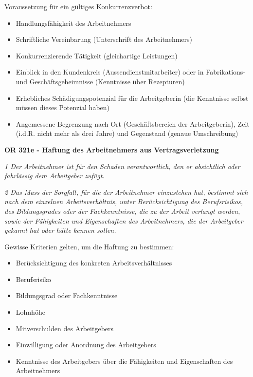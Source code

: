 \noindent
Voraussetzung für ein gültiges Konkurrenzverbot:
\begin{itemize}
  \item Handlungsfähigkeit des Arbeitnehmers
  \item Schriftliche Vereinbarung (Unterschrift des Arbeitnehmers)
  \item Konkurrenzierende Tätigkeit (gleichartige Leistungen)
  \item Einblick in den Kundenkreis (Aussendienstmitarbeiter) oder in Fabrikations- und Geschäftsgeheimnisse (Kenntnisse über Rezepturen)
  \item Erhebliches Schädigungspotenzial für die Arbeitgeberin (die Kenntnisse selbst müssen dieses Potenzial haben)
  \item Angemessene Begrenzung nach Ort (Geschäftsbereich der Arbeitgeberin), Zeit (i.d.R. nicht mehr als drei Jahre) und Gegenstand (genaue Umschreibung)
\end{itemize}
\vspace{3mm}

\noindent
\textbf{OR 321e - Haftung des Arbeitnehmers aus Vertragsverletzung}

\textit{1 Der Arbeitnehmer ist für den Schaden verantwortlich, den er absichtlich oder fahrlässig dem Arbeitgeber zufügt.}

\textit{2 Das Mass der Sorgfalt, für die der Arbeitnehmer einzustehen hat, bestimmt sich nach dem einzelnen Arbeitsverhältnis, unter Berücksichtigung des Berufsrisikos, des Bildungsgrades oder der Fachkenntnisse, die zu der Arbeit verlangt werden, sowie der Fähigkeiten und Eigenschaften des Arbeitnehmers, die der Arbeitgeber gekannt hat oder hätte kennen sollen.}

Gewisse Kriterien gelten, um die Haftung zu bestimmen:

\begin{itemize}
  \item Berücksichtigung des konkreten Arbeitsverhältnisses
  \item Berufsrisiko
  \item Bildungsgrad oder Fachkenntnisse
  \item Lohnhöhe
  \item Mitverschulden des Arbeitgebers
  \item Einwilligung oder Anordnung des Arbeitgebers
  \item Kenntnisse des Arbeitgebers über die Fähigkeiten und Eigenschaften des Arbeitnehmers
\end{itemize}

